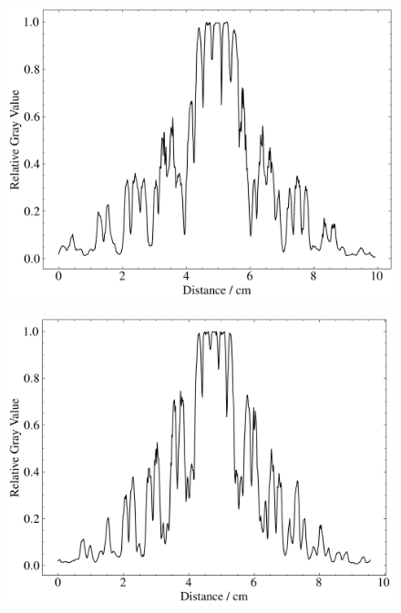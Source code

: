 \begin{figure}[htbp]
\begin{minipage}[ht]{0.48\hsize}
		\includegraphics[width=\linewidth]{src/figures/result/ds1_data_amp.png}
		\label{subfig:ds1_amp}
	\end{minipage}
	\begin{minipage}[ht]{0.48\hsize}\centering
		\includegraphics[width=\linewidth]{src/figures/result/ds2_data_amp.png}
		\label{subfig:ds2_amp}
	\end{minipage}
\end{figure}
